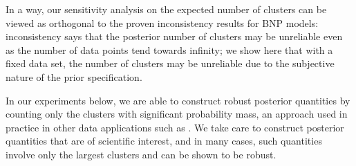 In a way, our sensitivity analysis on the expected number of clusters can be viewed as
orthogonal to the proven inconsistency results for BNP models: inconsistency says that the
posterior number of clusters may be unreliable even as the number of data points
tend towards infinity; we show here that with a fixed data set, the number of clusters
may be unreliable due to the subjective nature of the prior specification.

In our experiments below, we are able to construct robust posterior quantities
by counting only the clusters with significant probability mass,
an approach used in practice in other data applications such as \citet{fox:2007:dptracking}.
We take care to construct posterior quantities that are of scientific interest,
and in many cases, such quantities involve only the
largest clusters and can be shown to be robust.
